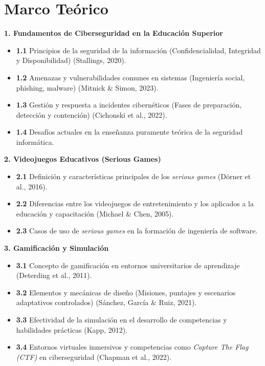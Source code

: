\newpage
\section{Marco Teórico}

\vspace{0.5cm}

\noindent\textbf{1. Fundamentos de Ciberseguridad en la Educación Superior}
\begin{itemize}
    \item \textbf{1.1} Principios de la seguridad de la información (Confidencialidad, Integridad y Disponibilidad) (Stallings, 2020).
    \item \textbf{1.2} Amenazas y vulnerabilidades comunes en sistemas (Ingeniería social, phishing, malware) (Mitnick \& Simon, 2023).
    \item \textbf{1.3} Gestión y respuesta a incidentes cibernéticos (Fases de preparación, detección y contención) (Cichonski et al., 2022).
    \item \textbf{1.4} Desafíos actuales en la enseñanza puramente teórica de la seguridad informática.
\end{itemize}

\newpage

\noindent\textbf{2. Videojuegos Educativos (Serious Games)}
\begin{itemize}
    \item \textbf{2.1} Definición y características principales de los \textit{serious games} (Dörner et al., 2016).
    \item \textbf{2.2} Diferencias entre los videojuegos de entretenimiento y los aplicados a la educación y capacitación (Michael \& Chen, 2005).
    \item \textbf{2.3} Casos de uso de \textit{serious games} en la formación de ingeniería de software.
\end{itemize}

\noindent\textbf{3. Gamificación y Simulación}
\begin{itemize}
    \item \textbf{3.1} Concepto de gamificación en entornos universitarios de aprendizaje (Deterding et al., 2011).
    \item \textbf{3.2} Elementos y mecánicas de diseño (Misiones, puntajes y escenarios adaptativos controlados) (Sánchez, García \& Ruiz, 2021).
    \item \textbf{3.3} Efectividad de la simulación en el desarrollo de competencias y habilidades prácticas (Kapp, 2012).
    \item \textbf{3.4} Entornos virtuales inmersivos y competencias como \textit{Capture The Flag (CTF)} en ciberseguridad (Chapman et al., 2022).
\end{itemize}

